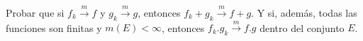 \documentclass{book}
\begin{document}










\begin{ejer}{} Probar que si $f_k \stackrel{m}{\rightarrow}f$ \;y\; $g_k \stackrel{m}{\rightarrow}g$, entonces \;
$f_k+g_k \stackrel{m}{\rightarrow}f+g$.  
Y si, además, todas las funciones son finitas y $m(E)<\infty$, entonces $f_k.g_k \stackrel{m} \rightarrow f.g$
dentro del conjunto $E$.
\end{ejer}
\end{document}
